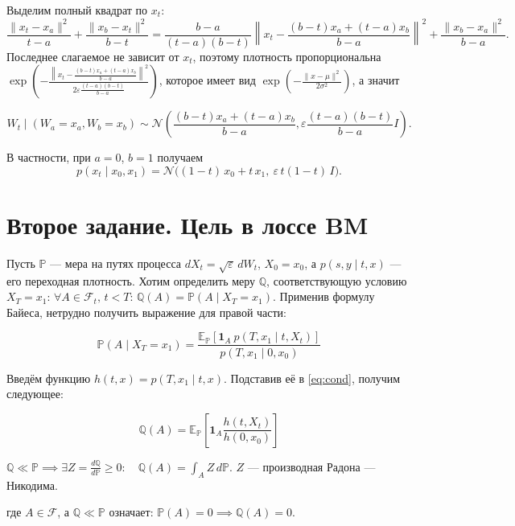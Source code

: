\documentclass[a4paper, 12pt]{article}
\begin{document}
Выделим полный квадрат по $x_t$:
\[
\frac{\|x_t - x_a\|^2}{t - a} + \frac{\|x_b - x_t\|^2}{b - t}
=
\frac{b-a}{(t-a)(b-t)}
\left\|x_t-\frac{(b-t)x_a+(t-a)x_b}{b-a}\right\|^2
+ \frac{\|x_b-x_a\|^2}{b-a}.
\]
Последнее слагаемое не зависит от $x_t$, поэтому плотность пропорциональна
\(
\exp\left(
-\frac{
\left\|x_t-
\frac{(b-t)x_a+(t-a)x_b}{b-a}
\right\|^2
}{
2\varepsilon\frac{(t-a)(b-t)}{b-a}
}
\right)
\), которое имеет вид $\exp\left(-\frac{\|x - \mu\|^2}{2\sigma^2}\right)$, а значит 

\[
\boxed{
W_t\mid(W_a=x_a,W_b=x_b)
\sim
\mathcal N\left(
\frac{(b-t)x_a+(t-a)x_b}{b-a},
\varepsilon\frac{(t-a)(b-t)}{b-a}I
\right).
}
\]

В частности, при $a = 0$, $b = 1$ получаем
\[
p(x_t \mid x_0, x_1) = \mathcal N\big((1-t)\,x_0 + t\,x_1,\ \varepsilon\,t(1-t)\,I\big).
\]

\newpage

\section{Второе задание. Цель в лоссе BM}

Пусть $\mathbb{P}$ --- мера на путях процесса $dX_t = \sqrt\varepsilon\, dW_t$, $X_0 = x_0$, а $p(s, y \mid t, x)$ --- его переходная плотность. Хотим определить меру $\mathbb{Q}$, соответствующую условию $X_T = x_1$: $\forall A \in \mathcal{F}_t, \, t < T: \, \mathbb{Q}(A) = \mathbb{P}(A \mid X_T = x_1)$. Применив формулу Байеса, нетрудно получить выражение для правой части:

\begin{equation}\label{eq:cond}
  \mathbb{P}(A \mid X_T = x_1) = \frac{\mathbb{E}_\mathbb{P} \left[ \mathbf{1}_A \ p(T, x_1 \mid t, X_t) \right]}{p(T, x_1 \mid 0, x_0)}
\end{equation}

Введём функцию $h(t, x) = p(T, x_1 \mid t, x) $. Подставив её в \eqref{eq:cond}, получим следующее:

\begin{equation}
  \mathbb{Q}(A) = \mathbb{E}_\mathbb{P} \left[ \mathbf{1}_A \frac{h(t, X_t)}{h(0, x_0)} \right]
\end{equation}

\begin{definition}
  \(
\mathbb Q\ll\mathbb P
\implies
\exists Z=\frac{d\mathbb Q}{d\mathbb P}\geq 0:
\quad
\mathbb Q(A)=\int_A Z\,d\mathbb P
\).  $Z$ --- производная Радона --- Никодима.

где \(A\in\mathcal F\), а \(\mathbb Q\ll\mathbb P\) означает:
\(
\mathbb P(A)=0\implies\mathbb Q(A)=0.
\)
\end{definition}
\end{document}
